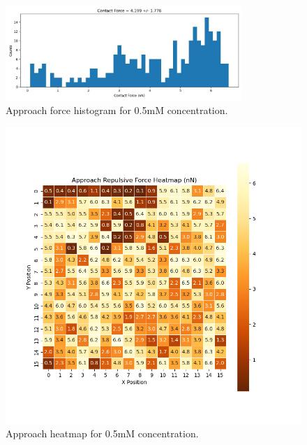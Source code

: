 \begin{figure}[h]
    \centering
    \includegraphics[width=0.8\textwidth]{chapter7/ForceMaps/0.5mM/approach_f_c_hist.jpg}
    \caption{Approach force histogram for 0.5mM concentration.}
    \label{fig:approach_f_c_hist_0.5mM}
\end{figure}


\begin{figure}[h]
    \centering
    \includegraphics[width=\textwidth]{chapter7/ForceMaps/0.5mM/Approach heatmap.png}
    \caption{Approach heatmap for 0.5mM concentration.}
    \label{fig:approach_heatmap_0.5mM}
\end{figure}

